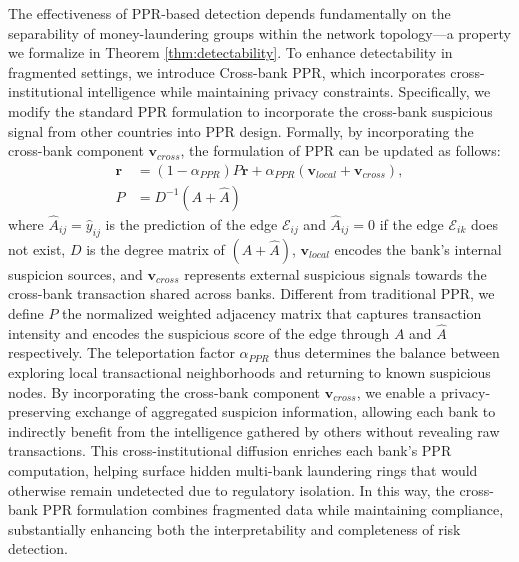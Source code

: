 The effectiveness of PPR-based detection depends fundamentally on the separability of money-laundering groups within the network topology—a property we formalize in Theorem \ref{thm:detectability}. To enhance detectability in fragmented settings, we introduce Cross-bank PPR, which incorporates cross-institutional intelligence while maintaining privacy constraints. Specifically, we modify the standard PPR formulation to incorporate the cross-bank suspicious signal from other countries into PPR design. 
Formally, by incorporating the cross-bank component $\boldsymbol{v}_{cross}$, the formulation of PPR can be updated as follows:
\begin{align}
    \boldsymbol{r} &= (1 - \alpha_{PPR})P \boldsymbol{r} + \alpha_{PPR} (\boldsymbol{v}_{local} + \label{PPR_weight} \boldsymbol{v}_{cross}), \\
    P &= D^{-1}(A + \hat{A})  
\label{eq:ppr}
\end{align}
where $\hat{A}_{ij}=\hat{y}_{ij}$ is the prediction of the edge $\mathcal{E}_{ij}$ and $\hat{A}_{ij}=0$ if the edge $\mathcal{E}_{ik}$ does not exist, $D$ is the degree matrix of $(A + \hat{A})$,  $\boldsymbol{v}_{local}$ encodes the bank’s internal suspicion sources, and $\boldsymbol{v}_{cross}$ represents external suspicious signals towards the cross-bank transaction shared across banks. Different from traditional PPR, we define $P$ the normalized weighted adjacency matrix that captures transaction intensity and encodes the suspicious score of the edge through $A$ and $\hat{A}$ respectively.
The teleportation factor $\alpha_{PPR}$ thus determines the balance between exploring local transactional neighborhoods and returning to known suspicious nodes. By incorporating the cross-bank component $\boldsymbol{v}_{cross}$, we enable a privacy-preserving exchange of aggregated suspicion information, allowing each bank to indirectly benefit from the intelligence gathered by others without revealing raw transactions. This cross-institutional diffusion enriches each bank’s PPR computation, helping surface hidden multi-bank laundering rings that would otherwise remain undetected due to regulatory isolation. In this way, the cross-bank PPR formulation combines fragmented data while maintaining compliance, substantially enhancing both the interpretability and completeness of risk detection.

